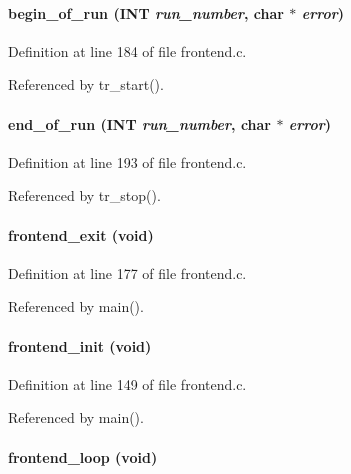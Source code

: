 \paragraph[{begin\_\-of\_\-run}]{ begin\_\-of\_\-run ({\bf INT} {\em run\_\-number}, \/  char $\ast$ {\em error})}\hfill\label{frontend_8c_ad8bfe703c49342b9f0275aba77dc7758}


Definition at line 184 of file frontend.c.

Referenced by tr\_\-start().
\paragraph[{end\_\-of\_\-run}]{ end\_\-of\_\-run ({\bf INT} {\em run\_\-number}, \/  char $\ast$ {\em error})}\hfill\label{frontend_8c_ae6d798649008b7523c77222bae2d4187}


Definition at line 193 of file frontend.c.

Referenced by tr\_\-stop().
\paragraph[{frontend\_\-exit}]{ frontend\_\-exit (void)}\hfill\label{frontend_8c_a15271255cca6c92978b28afd5a548382}


Definition at line 177 of file frontend.c.

Referenced by main().
\paragraph[{frontend\_\-init}]{ frontend\_\-init (void)}\hfill\label{frontend_8c_a34c51ae8c88f4717087b0604975516f4}


Definition at line 149 of file frontend.c.

Referenced by main().
\paragraph[{frontend\_\-loop}]{ frontend\_\-loop (void)}\hfill\label{frontend_8c_ada66837c3c3d263974ad717921145e0a}


